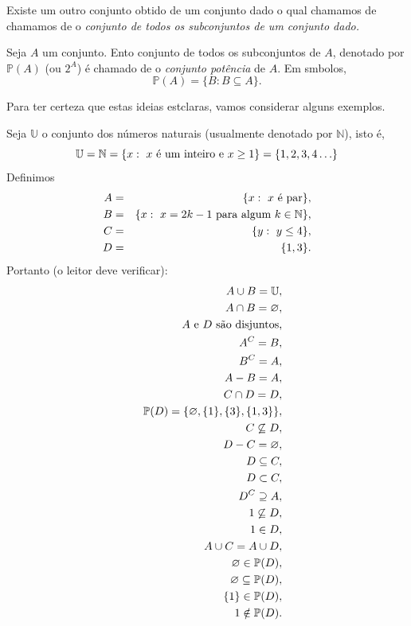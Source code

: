 Existe um outro conjunto obtido de um conjunto dado o qual chamamos de chamamos de o {\it conjunto de todos os subconjuntos de um conjunto dado.}

\begin{definb}
Seja $A$ um conjunto. Ent\ao o conjunto de todos os subconjuntos de $A$, denotado por $\mathbb{P}(A)$ (ou $2^{A}$) \'e chamado de o {\it conjunto pot\^encia} de $A$. Em s\ih mbolos, 
\[
\mathbb{P}(A) = \{B:B\subseteq A\}. 
\]
\end{definb}
Para ter certeza que estas ideias est\ao claras, vamos considerar alguns exemplos.

Seja $\mathbb{U}$ o conjunto dos n\'umeros naturais (usualmente denotado por $\mathbb{N}$), isto \'e,
\[
\mathbb{U}=\mathbb{N}=\{x:\textrm{ } x \textrm{ \'e um inteiro e $x\geq 1$}\}=\{1,2,3,4\ldots\}
\]
Definimos
\begin{eqnarray*}
A&=&\{x:\textrm{ } x \textrm{ \'e par}\},\\
B&=&\{x:\textrm{ } x=2k-1 \textrm{ para algum } k\in\mathbb{N}\},\\
C&=&\{y:\textrm{ } y\leq 4\},\\
D&=&\{1,3\}.\\
\end{eqnarray*}
Portanto (o leitor deve verificar):
\begin{eqnarray*}
&& A\cup B = \mathbb{U},\\
&& A\cap B = \varnothing,\\
&& \textrm{$A$ e $D$ s\~ao disjuntos,}\\
&& A^C=B,\\
&& B^C=A,\\
&& A-B=A,\\
&& C\cap D=D,\\
&& \mathbb{P}(D)=\{\varnothing,\{1\},\{3\},\{1,3\}\},\\
&& C\not\subseteq D,\\
&& D-C=\varnothing,\\
&& D\subseteq C,\\
&& D\subset C,\\
&& D^C\supseteq A,\\
&& 1\not\subseteq D,\\
&& 1\in D,\\
&& A\cup C=A\cup D,\\
&& \varnothing\in \mathbb{P}(D),\\
&& \varnothing\subseteq\mathbb{P}(D),\\
&& \{1\}\in\mathbb{P}(D),\\
&& 1\notin\mathbb{P}(D).
\end{eqnarray*}


